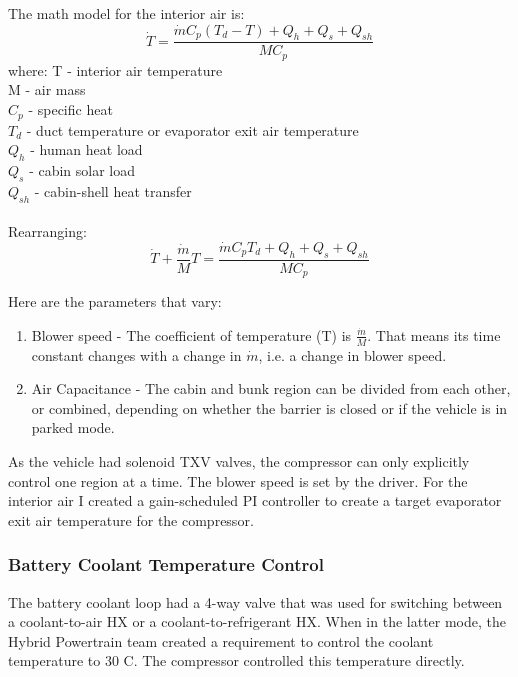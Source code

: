 The math model for the interior air is:
\begin{equation}
\dot{T} = \frac{\dot{m} C_p (T_d - T) + Q_h + Q_s + Q_{sh}}{MC_p}
\end{equation}
\newline
where:
\newline
T - interior air temperature \\
M - air mass \\
\(C_p\) - specific heat \\
\(T_d\) - duct temperature or evaporator exit air temperature \\
\(Q_h\) - human heat load \\
\(Q_s\) - cabin solar load \\
\(Q_{sh}\) - cabin-shell heat transfer \\
\\
Rearranging:
\begin{equation}
\dot{T} + \frac{\dot{m}}{M} T = \frac{\dot{m} C_p T_d + Q_h + Q_s + Q_{sh}}{MC_p}
\end{equation}

\noindent
Here are the parameters that vary:
\begin{enumerate}
  \item Blower speed - The coefficient of temperature (T) is \(\frac{\dot{m}}{M}\). That means its time constant changes with a change in \(\dot{m}\), i.e. a change in blower speed. 
  \item Air Capacitance - The cabin and bunk region can be divided from each other, or combined, depending on whether the barrier is closed or if the vehicle is in parked mode.
\end{enumerate}

As the vehicle had solenoid TXV valves, the compressor can only explicitly control one region at a time. The blower speed is set by the driver. For the interior air I created a gain-scheduled PI controller to create a target evaporator exit air temperature for the compressor.

\subsubsection * {Battery Coolant Temperature Control}
The battery coolant loop had a 4-way valve that was used for switching between a coolant-to-air HX or a coolant-to-refrigerant HX. When in the latter mode, the Hybrid Powertrain team created a requirement to control the coolant temperature to 30 \textdegree C. The compressor controlled this temperature directly.

